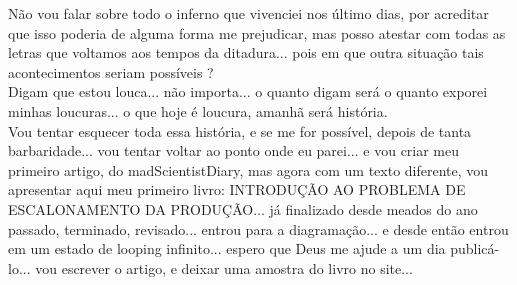 \documentclass{book}
\begin{document}
Não vou falar sobre todo o inferno que vivenciei nos último dias, por acreditar que isso poderia de alguma forma me prejudicar, mas posso atestar com todas as letras que voltamos aos tempos da ditadura... pois em que outra situação tais acontecimentos seriam possíveis ? \\

Digam que estou louca... não importa... o quanto digam será o quanto exporei minhas loucuras... o que hoje é loucura, amanhã será história. \\

Vou tentar esquecer toda essa história, e se me for possível, depois de tanta barbaridade... vou tentar voltar ao ponto onde eu parei... e vou criar meu primeiro artigo, do madScientistDiary, mas agora com um texto diferente, vou apresentar aqui meu primeiro livro: INTRODUÇÃO AO PROBLEMA DE ESCALONAMENTO DA PRODUÇÃO... já finalizado desde meados do ano passado, terminado, revisado... entrou para a diagramação... e desde então entrou em um estado de looping infinito... espero que Deus me ajude a um dia publicá-lo... vou escrever o artigo, e deixar uma amostra do livro no site... \\
\end{document}
